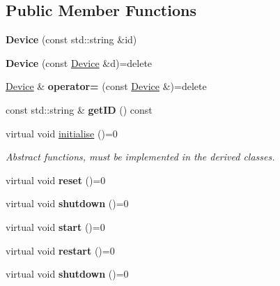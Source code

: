 \subsection*{Public Member Functions}
\begin{DoxyCompactItemize}
\item 
{\bfseries Device} (const std\+::string \&id)\hypertarget{class_device_a831fcd5aa1de172a75977ef04bbca56a}{}\label{class_device_a831fcd5aa1de172a75977ef04bbca56a}

\item 
{\bfseries Device} (const \hyperlink{class_device}{Device} \&d)=delete\hypertarget{class_device_ac396693bdad11f7cd4209da76fe651f3}{}\label{class_device_ac396693bdad11f7cd4209da76fe651f3}

\item 
\hyperlink{class_device}{Device} \& {\bfseries operator=} (const \hyperlink{class_device}{Device} \&)=delete\hypertarget{class_device_a25d835db7132fe7f8fd33ace1e19a780}{}\label{class_device_a25d835db7132fe7f8fd33ace1e19a780}

\item 
const std\+::string \& {\bfseries get\+ID} () const \hypertarget{class_device_a682e72b3243a703e7b6080f5f1c9553b}{}\label{class_device_a682e72b3243a703e7b6080f5f1c9553b}

\item 
virtual void \hyperlink{class_device_a66d75dab26ca84259877ca3fe5f2c2bd}{initialise} ()=0\hypertarget{class_device_a66d75dab26ca84259877ca3fe5f2c2bd}{}\label{class_device_a66d75dab26ca84259877ca3fe5f2c2bd}

\begin{DoxyCompactList}\small\item\em Abstract functions, must be implemented in the derived classes. \end{DoxyCompactList}\item 
virtual void {\bfseries reset} ()=0\hypertarget{class_device_a6e43162e890cb40eafb923b0c94d167a}{}\label{class_device_a6e43162e890cb40eafb923b0c94d167a}

\item 
virtual void {\bfseries shutdown} ()=0\hypertarget{class_device_aab20e3f9dc696c6a1153776d526dcc0b}{}\label{class_device_aab20e3f9dc696c6a1153776d526dcc0b}

\item 
virtual void {\bfseries start} ()=0\hypertarget{class_device_acaacba2e97dfde1b53c34970d2ebaef9}{}\label{class_device_acaacba2e97dfde1b53c34970d2ebaef9}

\item 
virtual void {\bfseries restart} ()=0\hypertarget{class_device_a5d4a86da7f8d97cec939831239a5a032}{}\label{class_device_a5d4a86da7f8d97cec939831239a5a032}

\item 
virtual void {\bfseries shutdown} ()=0\hypertarget{class_device_aab20e3f9dc696c6a1153776d526dcc0b}{}\label{class_device_aab20e3f9dc696c6a1153776d526dcc0b}

\end{DoxyCompactItemize}


